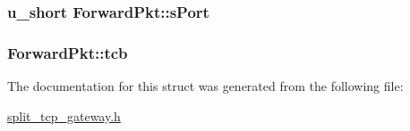 \hypertarget{structForwardPkt_a303504046c1d8f05b2a026da7e5a45ec}{
\subsubsection[{s\-Port}]{\setlength{\rightskip}{0pt plus 5cm}u\-\_\-short {\bf \-Forward\-Pkt\-::s\-Port}}}\label{structForwardPkt_a303504046c1d8f05b2a026da7e5a45ec}
\hypertarget{structForwardPkt_a3aa4c5efb82ffd5fc899806f697a6af7}{
\subsubsection[{tcb}]{ {\bf \-Forward\-Pkt\-::tcb}}}\label{structForwardPkt_a3aa4c5efb82ffd5fc899806f697a6af7}


\-The documentation for this struct was generated from the following file\-:\begin{DoxyCompactItemize}
\item 
\hyperlink{split__tcp__gateway_8h}{split\-\_\-tcp\-\_\-gateway.\-h}\end{DoxyCompactItemize}
